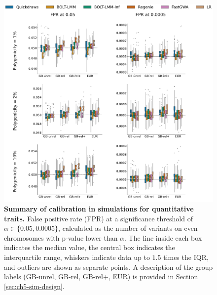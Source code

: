 \begin{figure}[h!]
    \centering
    \includegraphics[width=\textwidth]{figures/sim_calibration/qt_fpr.pdf}
    
    \caption{\textbf{Summary of calibration in simulations for quantitative traits.}
    False positive rate (FPR) at a significance threshold of $\alpha \in \{0.05, 0.0005\}$, calculated as the number of variants on even chromosomes with p-value lower than $\alpha$.
    The line inside each box indicates the median value, the central box indicates the interquartile range, whiskers indicate data up to $1.5$ times the IQR, and outliers are shown as separate points.
    A description of the group labels (GB-unrel, GB-rel, GB-rel+, EUR) is provided in Section \ref{sec:ch5-sim-design}.
    \label{fig:qd_sim_fpr_qt}
    }
\end{figure}

